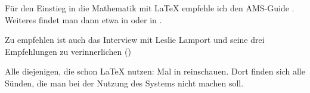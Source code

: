 \begin{myenumerate}
	\item
	Für den Einstieg in die Mathematik mit \LaTeX{} empfehle ich den AMS-Guide \cite{short-math-guide}.
	Weiteres findet man dann etwa in \textcite{graetzer:2007} oder in \textcite{voss:2012b}.	
	
	\item
	Zu empfehlen ist auch das Interview mit Leslie Lamport und seine drei Empfehlungen zu verinnerlichen (\cite{lamport:dmv})
	
	\item
	Alle diejenigen, die schon \LaTeX{} nutzen: Mal in \textcite{l2tabu} reinschauen.
	Dort finden sich alle Sünden, die man bei der Nutzung des Systems nicht machen soll.
	
		
\end{myenumerate}
